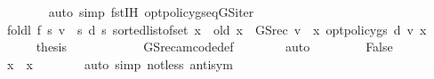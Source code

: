 \begin{isabellebody}
\ \ \ \ \ \ \isamarkupfalse%
\ {\isacharparenleft}{\kern0pt}auto\ simp{\isacharcolon}{\kern0pt}\ fst{\isacharunderscore}{\kern0pt}IH{\isacharprime}{\kern0pt}{\isacharprime}{\kern0pt}\ opt{\isacharunderscore}{\kern0pt}policy{\isacharunderscore}{\kern0pt}gs{\isacharprime}{\kern0pt}{\isacharunderscore}{\kern0pt}eq{\isacharunderscore}{\kern0pt}GS{\isacharunderscore}{\kern0pt}iter{\isacharprime}{\kern0pt}{\isacharparenright}{\kern0pt}\isanewline
\ \ \ \ \isamarkupfalse%
\ \isamarkupfalse%
\ {\isachardoublequoteopen}foldl\ {\isacharquery}{\kern0pt}f\ {\isacharparenleft}{\kern0pt}{\isasymlambda}s{\isachardot}{\kern0pt}\ {\isacharparenleft}{\kern0pt}v\ {\isachardollar}{\kern0pt}\ s{\isacharcomma}{\kern0pt}\ d\ s{\isacharparenright}{\kern0pt}{\isacharparenright}{\kern0pt}\ {\isacharparenleft}{\kern0pt}sorted{\isacharunderscore}{\kern0pt}list{\isacharunderscore}{\kern0pt}of{\isacharunderscore}{\kern0pt}set\ {\isacharbraceleft}{\kern0pt}{\isachardot}{\kern0pt}{\isachardot}{\kern0pt}x{\isacharbraceright}{\kern0pt}{\isacharparenright}{\kern0pt}\ {\isacharequal}{\kern0pt}\ {\isacharparenleft}{\kern0pt}{\isacharquery}{\kern0pt}old\ {\isacharparenleft}{\kern0pt}x\ {\isacharcolon}{\kern0pt}{\isacharequal}{\kern0pt}\ {\isacharparenleft}{\kern0pt}GS{\isacharunderscore}{\kern0pt}rec\ v\ {\isachardollar}{\kern0pt}\ x{\isacharcomma}{\kern0pt}\ opt{\isacharunderscore}{\kern0pt}policy{\isacharunderscore}{\kern0pt}gs{\isacharprime}{\kern0pt}\ d\ v\ x{\isacharparenright}{\kern0pt}{\isacharparenright}{\kern0pt}{\isacharparenright}{\kern0pt}{\isachardoublequoteclose}\isacommand{{\isachardot}{\kern0pt}}\isamarkupfalse%
\isanewline
\ \ \ \ \isamarkupfalse%
\ {\isacharquery}{\kern0pt}thesis\ \ \ \ \isanewline
\ \ \ \ \ \ \isamarkupfalse%
\ GS{\isacharunderscore}{\kern0pt}rec{\isacharunderscore}{\kern0pt}am{\isacharunderscore}{\kern0pt}code{\isacharunderscore}{\kern0pt}def\isanewline
\ \ \ \ \ \ \isamarkupfalse%
\ auto\isanewline
\ \ \isamarkupfalse%
\isanewline
\ \ \ \ \isamarkupfalse%
\ False\isanewline
\ \ \ \ \isamarkupfalse%
\ {\isachardoublequoteopen}{\isacharbraceleft}{\kern0pt}{\isachardot}{\kern0pt}{\isachardot}{\kern0pt}x{\isacharbraceright}{\kern0pt}\ {\isacharequal}{\kern0pt}\ {\isacharbraceleft}{\kern0pt}x{\isacharbraceright}{\kern0pt}{\isachardoublequoteclose}\isanewline
\ \ \ \ \ \ \isamarkupfalse%
\ {\isacharparenleft}{\kern0pt}auto\ simp{\isacharcolon}{\kern0pt}\ not{\isacharunderscore}{\kern0pt}less\ antisym{\isacharparenright}{\kern0pt}\isanewline

\end{isabellebody}

